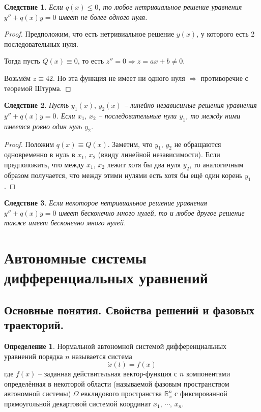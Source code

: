\documentclass[a4paper,12pt]{article}
\renewcommand{\leq}{\ensuremath{\leqslant}}
\theoremstyle{plain}
\newtheorem*{corollary}{Следствие}
\theoremstyle{definition}
\newtheorem{definition}{Определение}[section]
\theoremstyle{remark}
\begin{document}
\begin{corollary}
	Если $q(x) \leq 0$, то любое нетривиальное решение уравнения $y'' + q(x)y = 0$ имеет не более одного нуля.
\end{corollary}

\begin{proof}
	Предположим, что есть нетривиальное решение $y(x)$, у которого есть 2 последовательных нуля.

	Тогда пусть $Q(x) \equiv 0$, то есть $z'' = 0 \Rightarrow z = ax + b \neq 0$.

	Возьмём $z \equiv 42$. Но эта функция не имеет ни одного нуля $\Rightarrow$ противоречие с теоремой Штурма.
\end{proof}

\begin{corollary}
	Пусть $y_1(x),\,y_2(x)$ -- линейно независимые решения уравнения $y'' + q(x)y=0$. Если $x_1,\, x_2$ -- последовательные нули $y_1$, то между ними имеется ровно один нуль $y_2$.
\end{corollary}

\begin{proof}
	Положим $q(x) \equiv Q(x)$. Заметим, что $y_1,\,y_2$ не обращаются одновременно в нуль в $x_1,\, x_2$ (ввиду линейной независимости). Если предположить, что между $x_1,\,x_2$ лежит хотя бы два нуля $y_2$, то аналогичным образом получается, что между этими нулями есть хотя бы ещё один корень $y_1$.
\end{proof}

\begin{corollary}
	Если некоторое нетривиальное решение уравнения $y'' + q(x)y = 0$ имеет бесконечно много нулей, то и любое другое решение также имеет бесконечно много нулей.
\end{corollary}

\section{Автономные системы дифференциальных уравнений}
\subsection{Основные понятия. Свойства решений и фазовых траекторий.}
\begin{definition}
	Нормальной автономной системой дифференциальных уравнений порядка $n$ называется система
	\[\dot{x}(t) = f(x)\]
	где $f(x)$ -- заданная действительная вектор-функция с $n$ компонентами определённая в некоторой области (называемой фазовым пространством автономной системы) $\Omega$ евклидового пространства $\mathbb{R}^n_x$ с фиксированной прямоугольной декартовой системой координат $x_1,\,\cdots,\,x_n$.
\end{definition}
\end{document}
